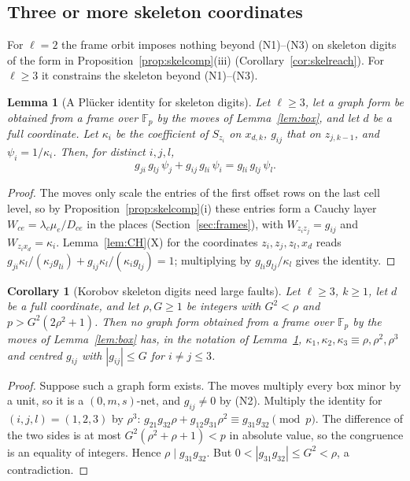 \documentclass[11pt]{amsart}
\newtheorem{lemma}[theorem]{Lemma}
\newtheorem{corollary}[theorem]{Corollary}
\theoremstyle{definition}
\theoremstyle{plain}
\newcommand{\F}{\mathbb{F}}
\begin{document}
\subsection{Three or more skeleton coordinates}
For $\ell=2$ the frame orbit imposes nothing beyond (N1)--(N3) on skeleton digits of the form in Proposition~\ref{prop:skelcomp}(iii) (Corollary~\ref{cor:skelreach}). For $\ell\ge3$ it constrains the skeleton beyond (N1)--(N3).

\begin{lemma}[A Pl\"ucker identity for skeleton digits]\label{lem:frameid}
Let $\ell\ge3$, let a graph form be obtained from a frame over $\F_p$ by the moves of Lemma~\ref{lem:box}, and let $d$ be a full coordinate. Let $\kappa_i$ be the coefficient of $S_{z_i}$ on $x_{d,k}$, $g_{ij}$ that on $z_{j,k-1}$, and $\psi_i=1/\kappa_i$. Then, for distinct $i,j,l$,
\[
g_{ji}\,g_{lj}\,\psi_j+g_{ij}\,g_{li}\,\psi_i=g_{li}\,g_{lj}\,\psi_l .
\]
\end{lemma}

\begin{proof}
The moves only scale the entries of the first offset rows on the last cell level, so by Proposition~\ref{prop:skelcomp}(i) these entries form a Cauchy layer $W_{ce}=\lambda_c\mu_e/D_{ce}$ in the places (Section~\ref{sec:frames}), with $W_{z_iz_j}=g_{ij}$ and $W_{z_ix_d}=\kappa_i$. Lemma~\ref{lem:CH}(X) for the coordinates $z_i,z_j,z_l,x_d$ reads $g_{ji}\kappa_l/(\kappa_jg_{li})+g_{ij}\kappa_l/(\kappa_ig_{lj})=1$; multiplying by $g_{li}g_{lj}/\kappa_l$ gives the identity.
\end{proof}

\begin{corollary}[Korobov skeleton digits need large faults]\label{cor:frameid}
Let $\ell\ge3$, $k\ge1$, let $d$ be a full coordinate, and let $\rho,G\ge1$ be integers with $G^2<\rho$ and $p>G^2(2\rho^2+1)$. Then no graph form obtained from a frame over $\F_p$ by the moves of Lemma~\ref{lem:box} has, in the notation of Lemma~\ref{lem:frameid}, $\kappa_1,\kappa_2,\kappa_3\equiv\rho,\rho^2,\rho^3$ and centred $g_{ij}$ with $|g_{ij}|\le G$ for $i\ne j\le3$.
\end{corollary}

\begin{proof}
Suppose such a graph form exists. The moves multiply every box minor by a unit, so it is a $(0,m,s)$-net, and $g_{ij}\ne0$ by (N2). Multiply the identity for $(i,j,l)=(1,2,3)$ by $\rho^3$: $g_{21}g_{32}\rho+g_{12}g_{31}\rho^2\equiv g_{31}g_{32}\pmod p$. The difference of the two sides is at most $G^2(\rho^2+\rho+1)<p$ in absolute value, so the congruence is an equality of integers. Hence $\rho\mid g_{31}g_{32}$. But $0<|g_{31}g_{32}|\le G^2<\rho$, a contradiction.
\end{proof}
\end{document}
